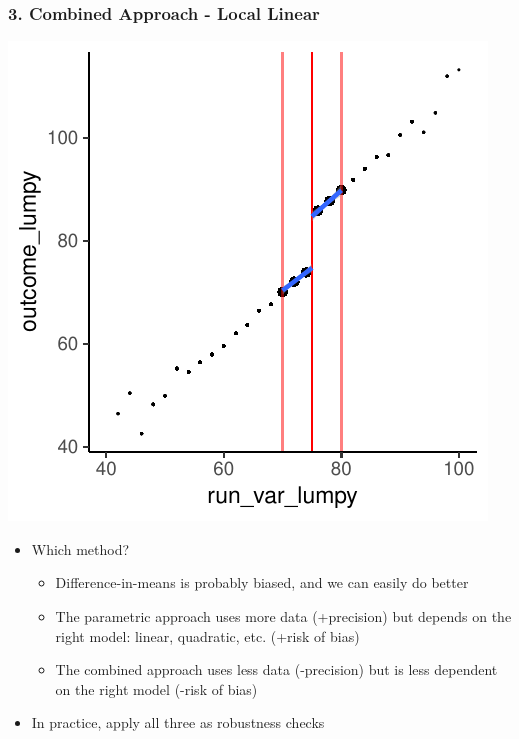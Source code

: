 \documentclass[xcolor=x11names,compress]{beamer}\usepackage[]{graphicx}\usepackage[]{color}
\makeatletter
\def\maxwidth{ %
  \ifdim\Gin@nat@width>\linewidth
    \linewidth
  \else
    \Gin@nat@width
  \fi
}
\newenvironment{knitrout}{}{} %
\renewcommand{\(}{\begin{columns}}
\renewcommand{\)}{\end{columns}}
\newcommand{\<}[1]{\begin{column}{#1}}
\renewcommand{\>}{\end{column}}
\makeatother
\begin{document}
\begin{frame}
\frametitle{3. Combined Approach - Local Linear}
\begin{center}
\begin{knitrout}
\color{fgcolor}
\includegraphics[width=\maxwidth]{figure/chart6-1} 

\end{knitrout}
\end{center}
\end{frame}

\begin{frame}
\begin{itemize}
\item Which method?
\pause
\begin{itemize}
\item Difference-in-means is probably biased, and we can easily do better
\pause
\item The parametric approach uses more data (+precision) but depends on the right model: linear, quadratic, etc. (+risk of bias)
\pause
\item The combined approach uses less data (-precision) but is less dependent on the right model (-risk of bias)
\pause
\end{itemize}
\item In practice, apply all three as robustness checks
\end{itemize}
\end{frame}
\end{document}
